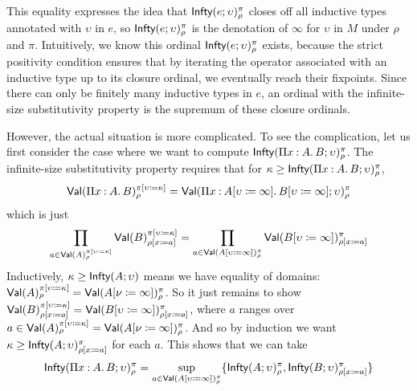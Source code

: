 This equality expresses the idea that $\textsf{Infty}(e;\upsilon)_\rho^\pi$
closes off all inductive types annotated with $\upsilon$ in $e$, so
$\textsf{Infty}(e;\upsilon)_\rho^\pi$ is the denotation of $\infty$ for $\upsilon$ in
$M$ under $\rho$ and $\pi$.
%
Intuitively, we know this ordinal $\textsf{Infty}(e;\upsilon)_\rho^\pi$ exists,
because the strict positivity condition ensures that by iterating the
operator associated with an inductive type up to its closure ordinal,
we eventually reach their fixpoints.
%
Since there can only be finitely many inductive types in $e$, an
ordinal with the infinite-size substitutivity property is the
supremum of these closure ordinals.

However, the actual situation is more complicated.
%
To see the complication, let us first consider the case where we want to compute
$\textsf{Infty}(\Pi x \mathbin{:} A \mathpunct{.} B;\upsilon)_\rho^\pi$.
%
The infinite-size substitutivity property requires that for
$\kappa \geq \textsf{Infty}(\Pi x \mathbin{:} A \mathpunct{.} B;\upsilon)_\rho^\pi$,
%
\begin{align*}
  \textsf{Val}(\Pi x \mathbin{:} A \mathpunct{.} B)_\rho^{\pi [\upsilon \coloneqq \kappa]} =
  \textsf{Val}(\Pi x \mathbin{:} A [\upsilon \coloneqq \infty] \mathpunct{.} B [\upsilon \coloneqq \infty];\upsilon)_\rho^\pi
\end{align*}
%
which is just
%
\begin{align*}
  \setprod_{a \in \Val(A)_\rho^{\subst{\pi}{\upsilon}{\kappa}}}
  {\Val(B)_{\subst{\rho}{x}{a}}^{\subst{\pi}{\upsilon}{\kappa}}}
  =
  \setprod_{a \in \Val(\subst{A}{\upsilon}{\infty})_\rho^\pi}
  {\Val(\subst{B}{\upsilon}{\infty})_{\subst{\rho}{x}{a}}^{\pi}}
\end{align*}
%
Inductively, $\kappa \geq \textsf{Infty}(A;\upsilon)$ means we have equality of domains:
$\textsf{Val}(A)_\rho^{\pi [\upsilon \coloneqq \kappa]} = \textsf{Val}(A [\nu \coloneqq \infty])_\rho^\pi$.
%
So it just remains to show %
$\textsf{Val}(B)_{\rho [x \coloneqq a]}^{\pi [\upsilon \coloneqq \kappa]} =
\textsf{Val}(B [\upsilon \coloneqq \infty])_{\rho [x \coloneqq a]}^{\pi}$, where
$a$ ranges over
$a \in \textsf{Val}(A)_\rho^{\pi [\upsilon \coloneqq \kappa]} =
\textsf{Val}(A [\nu \coloneqq \infty])_\rho^\pi$.
%
And so by induction we want
$\kappa \geq \textsf{Infty}(A;\upsilon)_{\rho [x \coloneqq a]}^\pi$ for each
$a$.
%
This shows that we can take
%
\begin{align*}
  \textsf{Infty}(\Pi x \mathbin{:} A \mathpunct{.} B;\upsilon)_\rho^\pi =
  \sup_{a \in \textsf{Val}(A [\upsilon \coloneqq \infty])_\rho^\pi}\{
  \textsf{Infty}(A;\upsilon)_\rho^\pi, \textsf{Infty}(B;\upsilon)_{\rho [x \coloneqq a]}^\pi
  \}
\end{align*}


